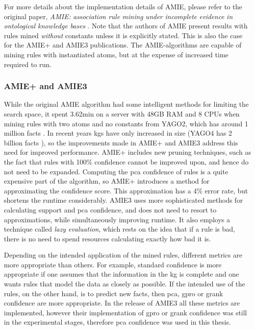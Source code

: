 For more details about the implementation details of AMIE, please refer to the original paper, \textit{AMIE: association rule mining under incomplete evidence in ontological knowledge bases} \cite{amie_plus}. Note that the authors of AMIE present results with rules mined \textit{without} constants unless it is explicitly stated. This is also the case for the AMIE+ and AMIE3 publications. The AMIE-algorithms are capable of mining rules with instantiated atoms, but at the expense of increased time required to run.

\subsubsection{AMIE+ and AMIE3}
While the original AMIE algorithm had some intelligent methods for limiting the search space, it spent 3.62min on a server with 48GB RAM and 8 CPUs \cite{amie} when mining rules with two atoms and no constants from YAGO2, which has around 1 million facts \cite{yago2}. In recent years \glspl{kg} have only increased in size (YAGO4 has 2 billion facts \cite{yago4}), so the improvements made in AMIE+ and AMIE3 address this need for improved performance. AMIE+ includes new pruning techniques, such as the fact that rules with 100\% confidence cannot be improved upon, and hence do not need to be expanded. Computing the \gls{pca} confidence of rules is a quite expensive part of the algorithm, so AMIE+ introduces a method for approximating the confidence score. This approximation has a 4\% error rate, but shortens the runtime considerably. AMIE3 uses more sophisticated methods for calculating support and \gls{pca} confidence, and does not need to resort to approximations, while simultaneously improving runtime. It also employs a technique called \textit{lazy evaluation}, which rests on the idea that if a rule is bad, there is no need to spend resources calculating exactly how bad it is. 

Depending on the intended application of the mined rules, different metrics are more appropriate than others. For example, standard confidence is more appropriate if one assumes that the information in the \gls{kg} is complete and one wants rules that model the data as closely as possible. If the intended use of the rules, on the other hand, is to predict new facts, then \gls{pca}, \gls{gpro} or \gls{grank} confidence are more appropriate. In the release of AMIE3 all these metrics are implemented, however their implementation of \gls{gpro} or \gls{grank} confidence was still in the experimental stages, therefore \gls{pca} confidence was used in this thesis.


